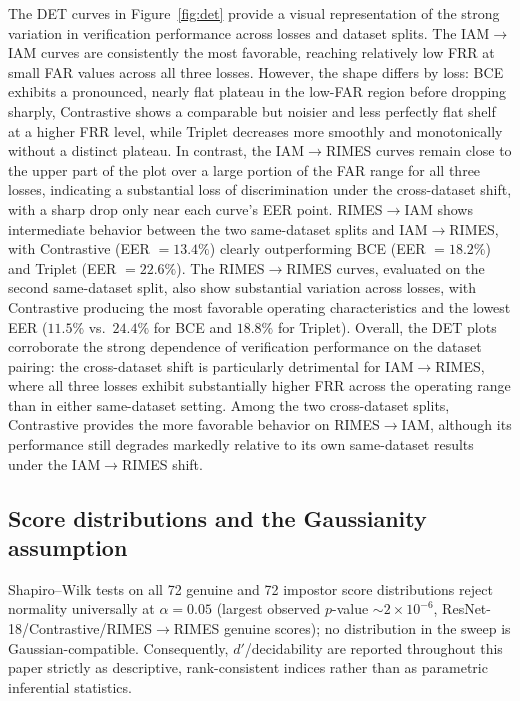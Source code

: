 The DET curves in Figure~\ref{fig:det} provide a visual representation
of the strong variation in verification performance across losses and
dataset splits. The IAM$\to$IAM curves are consistently the most
favorable, reaching relatively low FRR at small FAR values across all
three losses. However, the shape differs by loss: BCE exhibits a
pronounced, nearly flat plateau in the low-FAR region before dropping
sharply, Contrastive shows a comparable but noisier and less
perfectly flat shelf at a higher FRR level, while Triplet decreases
more smoothly and monotonically without a distinct plateau. In
contrast, the IAM$\to$RIMES curves remain close to the upper part of
the plot over a large portion of the FAR range for all three losses,
indicating a substantial loss of discrimination under the
cross-dataset shift, with a sharp drop only near each curve's EER
point. RIMES$\to$IAM shows intermediate behavior between the two
same-dataset splits and IAM$\to$RIMES, with Contrastive (EER $=13.4\%$)
clearly outperforming BCE (EER $=18.2\%$) and Triplet (EER $=22.6\%$).
The RIMES$\to$RIMES curves, evaluated on the second same-dataset
split, also show substantial variation across losses, with Contrastive
producing the most favorable operating characteristics and the lowest
EER ($11.5\%$ vs.\ $24.4\%$ for BCE and $18.8\%$ for Triplet). Overall,
the DET plots corroborate the strong dependence of verification
performance on the dataset pairing: the cross-dataset shift is
particularly detrimental for IAM$\to$RIMES, where all three losses
exhibit substantially higher FRR across the operating range than in
either same-dataset setting. Among the two cross-dataset splits,
Contrastive provides the more favorable behavior on RIMES$\to$IAM,
although its performance still degrades markedly relative to its own
same-dataset results under the IAM$\to$RIMES shift.

\subsection{Score distributions and the Gaussianity assumption}
\label{sec:distributions}

Shapiro--Wilk tests on all 72 genuine and 72 impostor score
distributions reject normality universally at $\alpha=0.05$ (largest
observed $p$-value $\sim2\times10^{-6}$, ResNet-18/Contrastive/RIMES$\to$RIMES
genuine scores); no distribution in the sweep is Gaussian-compatible.
Consequently, $d'$/decidability are reported throughout this paper
strictly as descriptive, rank-consistent indices rather than as
parametric inferential statistics.

